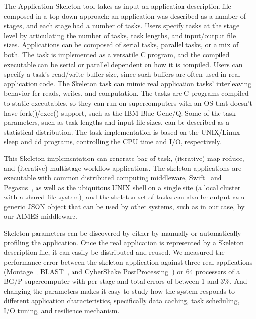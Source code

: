 \documentclass[preprint,12pt]{elsarticle}
\begin{document}
The Application Skeleton tool takes as input an application description file composed in a top-down approach: an application was described
as a number of stages, and each stage had a number of tasks. Users specify tasks at the stage level by articulating
the number of tasks, task lengths, and input/output file sizes. Applications can be composed of serial tasks, parallel tasks, or a mix of both. The task is implemented as a versatile C program, and the compiled executable can be serial or parallel dependent on how it is compiled. 
Users can specify a task's read/write buffer size, since such buffers are often used in real application code. 
The Skeleton task can mimic real application tasks' interleaving behavior for reads, writes, and computation. 
The tasks are C programs compiled to static executables, so they can run on supercomputers with an OS that doesn't have fork()/exec() support, such as the IBM Blue Gene/Q. 
Some of the task parameters, such as task lengths and input file sizes, can be
described as a statistical distribution.
The task implementation is based on the UNIX/Linux sleep and dd programs, controlling the CPU time and I/O, respectively.

This Skeleton implementation can generate bag-of-task, (iterative) map-reduce, and (iterative) multistage workflow applications. 
The skeleton applications are executable with common
distributed computing middleware, Swift~\cite{SWIFT2007, swift-ieee09, Swift_2011} and Pegasus~\cite{pegasus, pegasus-04}, as well as the ubiquitous UNIX shell on a single 
site (a local cluster with a shared file system), and the skeleton set of tasks can also be output as a generic JSON object that can be used by other systems, such as in our case, by our AIMES middleware.

Skeleton parameters can be discovered by either by manually or automatically profiling the application.
Once the real application is represented by a Skeleton description file, it can easily be distributed and reused.  
We measured the performance error between the skeleton application against three real applications (Montage~\cite{montage1,montage2}, BLAST~\cite{ParallelBlast}, and CyberShake PostProcessing~\cite{SCEC07}) on 64 processors of a BG/P supercomputer with per stage and total errors of between 1 and 3\%.
And changing the parameters makes it easy to study how the system responds to different application characteristics, specifically data caching, task scheduling, I/O tuning, and resilience mechanism.
\end{document}

